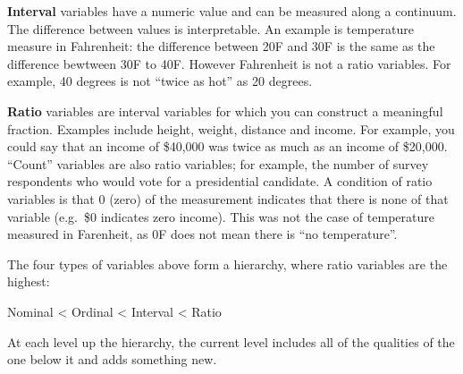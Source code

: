 \documentclass[
  12pt,
]{krantz}
\begin{document}
\textbf{Interval} variables have a numeric value and can be measured along a continuum. The difference between values is interpretable. An example is temperature measure in Fahrenheit: the difference between 20F and 30F is the same as the difference bewtween 30F to 40F. However Fahrenheit is not a ratio variables. For example, 40 degrees is not ``twice as hot'' as 20 degrees.

\textbf{Ratio} variables are interval variables for which you can construct a meaningful fraction. Examples include height, weight, distance and income. For example, you could say that an income of \$40,000 was twice as much as an income of \$20,000. ``Count'' variables are also ratio variables; for example, the number of survey respondents who would vote for a presidential candidate. A condition of ratio variables is that 0 (zero) of the measurement indicates that there is none of that variable (e.g.~\$0 indicates zero income). This was not the case of temperature measured in Farenheit, as 0F does not mean there is ``no temperature''.

The four types of variables above form a hierarchy, where ratio variables are the highest:

Nominal \textless{} Ordinal \textless{} Interval \textless{} Ratio

At each level up the hierarchy, the current level includes all of the qualities of the one below it and adds something new.

  
\end{document}

